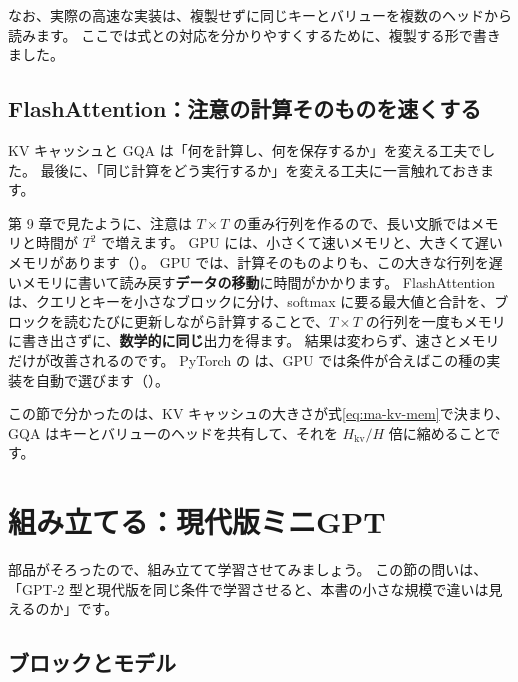 なお、実際の高速な実装は、複製せずに同じキーとバリューを複数のヘッドから読みます。
ここでは式との対応を分かりやすくするために、複製する形で書きました。

\subsection*{FlashAttention：注意の計算そのものを速くする}

KV キャッシュと GQA は「何を計算し、何を保存するか」を変える工夫でした。
最後に、「同じ計算をどう実行するか」を変える工夫に一言触れておきます。

第 9 章で見たように、注意は $T\times T$ の重み行列を作るので、長い文脈ではメモリと時間が $T^2$ で増えます。
GPU には、小さくて速いメモリと、大きくて遅いメモリがあります（）。
GPU では、計算そのものよりも、この大きな行列を遅いメモリに書いて読み戻す\textbf{データの移動}に時間がかかります。
FlashAttention\cite{dao2022flashattention}は、クエリとキーを小さなブロックに分け、softmax に要る最大値と合計を、ブロックを読むたびに更新しながら計算することで、$T\times T$ の行列を一度もメモリに書き出さずに、\textbf{数学的に同じ}出力を得ます。
結果は変わらず、速さとメモリだけが改善されるのです。
PyTorch の  は、GPU では条件が合えばこの種の実装を自動で選びます（）。

この節で分かったのは、KV キャッシュの大きさが式\eqref{eq:ma-kv-mem}で決まり、GQA はキーとバリューのヘッドを共有して、それを $H_{\mathrm{kv}}/H$ 倍に縮めることです。

\section{組み立てる：現代版ミニGPT}\label{sec:ma-assemble}

部品がそろったので、組み立てて学習させてみましょう。
この節の問いは、「GPT-2 型と現代版を同じ条件で学習させると、本書の小さな規模で違いは見えるのか」です。

\subsection*{ブロックとモデル}

